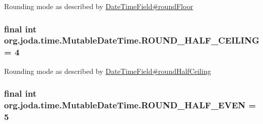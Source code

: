 Rounding mode as described by \hyperlink{classorg_1_1joda_1_1time_1_1_date_time_field_a324fc5295f21a7777080a423d256604a}{Date\-Time\-Field\#round\-Floor} \hypertarget{classorg_1_1joda_1_1time_1_1_mutable_date_time_a9e588c9009469120f0c84e24607ef43c}{
\subsubsection[{R\-O\-U\-N\-D\-\_\-\-H\-A\-L\-F\-\_\-\-C\-E\-I\-L\-I\-N\-G}]{\setlength{\rightskip}{0pt plus 5cm}final int org.\-joda.\-time.\-Mutable\-Date\-Time.\-R\-O\-U\-N\-D\-\_\-\-H\-A\-L\-F\-\_\-\-C\-E\-I\-L\-I\-N\-G = 4\hspace{0.3cm}{\ttfamily [static]}}}\label{classorg_1_1joda_1_1time_1_1_mutable_date_time_a9e588c9009469120f0c84e24607ef43c}
Rounding mode as described by \hyperlink{classorg_1_1joda_1_1time_1_1_date_time_field_a5b686d15e7aac079498463bb9035342f}{Date\-Time\-Field\#round\-Half\-Ceiling} \hypertarget{classorg_1_1joda_1_1time_1_1_mutable_date_time_aaabdd51ce47f2ec90511a2e5ecededc5}{
\subsubsection[{R\-O\-U\-N\-D\-\_\-\-H\-A\-L\-F\-\_\-\-E\-V\-E\-N}]{\setlength{\rightskip}{0pt plus 5cm}final int org.\-joda.\-time.\-Mutable\-Date\-Time.\-R\-O\-U\-N\-D\-\_\-\-H\-A\-L\-F\-\_\-\-E\-V\-E\-N = 5\hspace{0.3cm}{\ttfamily [static]}}}\label{classorg_1_1joda_1_1time_1_1_mutable_date_time_aaabdd51ce47f2ec90511a2e5ecededc5}
